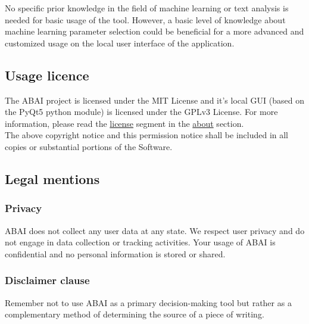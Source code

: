 No specific prior knowledge in the field of machine learning or text analysis is needed for basic usage of the tool. However, a basic level of knowledge about machine learning parameter selection could be beneficial for a more advanced and customized usage on the local user interface of the application.\\

\subsection{Usage licence}
The ABAI project is licensed under the MIT License and it's local GUI (based on the PyQt5 python module) is licensed under the GPLv3 License. For more information, please read the \hyperref[subsec:License]{license} segment in the \hyperref[sec:About]{about} section.\\

The above copyright notice and this permission notice shall be included in all
copies or substantial portions of the Software.


\subsection{Legal mentions}

    \subsubsection{Privacy}
    ABAI does not collect any user data at any state. We respect user privacy and do not engage in data collection or tracking activities. Your usage of ABAI is confidential and no personal information is stored or shared.

    \subsubsection{Disclaimer clause}
    Remember not to use ABAI as a primary decision-making tool but rather as a complementary method of determining the source of a piece of writing.
